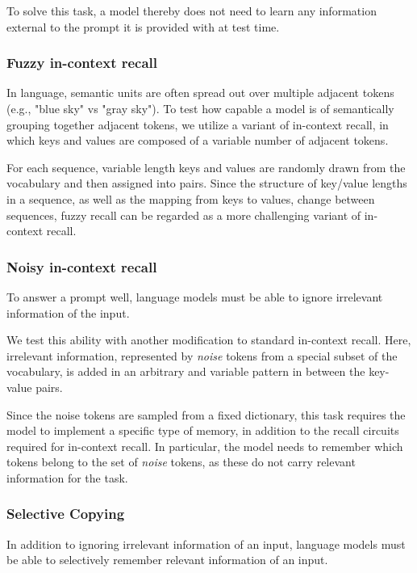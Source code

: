 To solve this task, a model thereby does not need to learn any information external to the prompt it is provided with at test time. 

\subsubsection{Fuzzy in-context recall}

In language, semantic units are often spread out over multiple adjacent tokens (e.g., "blue sky" vs "gray sky"). To test how capable a model is of semantically grouping together adjacent tokens, we utilize a variant of in-context recall, in which keys and values are composed of a variable number of adjacent tokens.

For each sequence, variable length keys and values are randomly drawn from the vocabulary and then assigned into pairs. Since the structure of key/value lengths in a sequence, as well as the mapping from keys to values, change between sequences, fuzzy recall can be regarded as a more challenging variant of in-context recall.

\subsubsection{Noisy in-context recall}

To answer a prompt well, language models must be able to ignore irrelevant information of the input.

We test this ability with another modification to standard in-context recall. Here, irrelevant information, represented by \textit{noise} tokens from a special subset of the vocabulary, is added in an arbitrary and variable pattern in between the key-value pairs.

Since the noise tokens are sampled from a fixed dictionary, this task  requires the model to implement a specific type of memory, in addition to the recall circuits required for in-context recall. In particular, the model needs to remember which tokens belong to the set of \textit{noise} tokens, as these do not carry relevant information for the task.

\subsubsection{Selective Copying}

In addition to ignoring irrelevant information of an input, language models must be able to selectively remember relevant information of an input.

